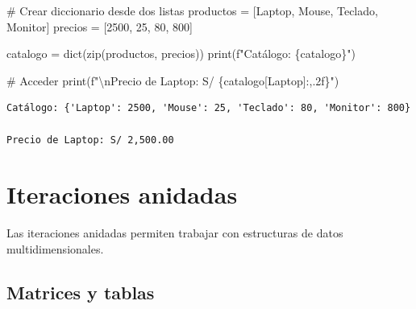 \documentclass[
  doc,
  floatsintext,
  longtable,
  a4paper,
  nolmodern,
  notxfonts,
  notimes,
  12pt,
  colorlinks=true,linkcolor=blue,citecolor=blue,urlcolor=blue]{apa7}
\newenvironment{Shaded}{\begin{snugshade}}{\end{snugshade}}
\newcommand{\BuiltInTok}[1]{\textcolor[rgb]{0.00,0.23,0.31}{#1}}
\newcommand{\CharTok}[1]{\textcolor[rgb]{0.13,0.47,0.30}{#1}}
\newcommand{\CommentTok}[1]{\textcolor[rgb]{0.37,0.37,0.37}{#1}}
\newcommand{\DecValTok}[1]{\textcolor[rgb]{0.68,0.00,0.00}{#1}}
\newcommand{\NormalTok}[1]{\textcolor[rgb]{0.00,0.23,0.31}{#1}}
\newcommand{\OperatorTok}[1]{\textcolor[rgb]{0.37,0.37,0.37}{#1}}
\newcommand{\SpecialCharTok}[1]{\textcolor[rgb]{0.37,0.37,0.37}{#1}}
\newcommand{\SpecialStringTok}[1]{\textcolor[rgb]{0.13,0.47,0.30}{#1}}
\newcommand{\StringTok}[1]{\textcolor[rgb]{0.13,0.47,0.30}{#1}}
\begin{document}
\begin{Shaded}
\begin{Highlighting}[]
\CommentTok{\# Crear diccionario desde dos listas}
\NormalTok{productos }\OperatorTok{=}\NormalTok{ [}\StringTok{\textquotesingle{}Laptop\textquotesingle{}}\NormalTok{, }\StringTok{\textquotesingle{}Mouse\textquotesingle{}}\NormalTok{, }\StringTok{\textquotesingle{}Teclado\textquotesingle{}}\NormalTok{, }\StringTok{\textquotesingle{}Monitor\textquotesingle{}}\NormalTok{]}
\NormalTok{precios }\OperatorTok{=}\NormalTok{ [}\DecValTok{2500}\NormalTok{, }\DecValTok{25}\NormalTok{, }\DecValTok{80}\NormalTok{, }\DecValTok{800}\NormalTok{]}

\NormalTok{catalogo }\OperatorTok{=} \BuiltInTok{dict}\NormalTok{(}\BuiltInTok{zip}\NormalTok{(productos, precios))}
\BuiltInTok{print}\NormalTok{(}\SpecialStringTok{f"Catálogo: }\SpecialCharTok{\{}\NormalTok{catalogo}\SpecialCharTok{\}}\SpecialStringTok{"}\NormalTok{)}

\CommentTok{\# Acceder}
\BuiltInTok{print}\NormalTok{(}\SpecialStringTok{f"}\CharTok{\textbackslash{}n}\SpecialStringTok{Precio de Laptop: S/ }\SpecialCharTok{\{}\NormalTok{catalogo[}\StringTok{\textquotesingle{}Laptop\textquotesingle{}}\NormalTok{]}\SpecialCharTok{:,.2f\}}\SpecialStringTok{"}\NormalTok{)}
\end{Highlighting}
\end{Shaded}

\begin{verbatim}
Catálogo: {'Laptop': 2500, 'Mouse': 25, 'Teclado': 80, 'Monitor': 800}

Precio de Laptop: S/ 2,500.00
\end{verbatim}

\section{Iteraciones anidadas}\label{iteraciones-anidadas}

Las iteraciones anidadas permiten trabajar con estructuras de datos
multidimensionales.

\subsection{Matrices y tablas}\label{matrices-y-tablas}
\end{document}
